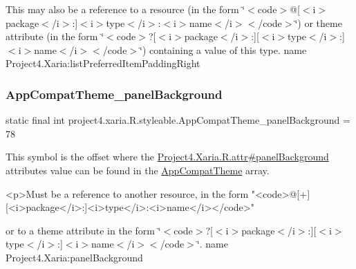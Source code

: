 This may also be a reference to a resource (in the form \char`\"{}$<$code$>$@\mbox{[}$<$i$>$package$<$/i$>$\+:\mbox{]}$<$i$>$type$<$/i$>$\+:$<$i$>$name$<$/i$>$$<$/code$>$\char`\"{}) or theme attribute (in the form \char`\"{}$<$code$>$?\mbox{[}$<$i$>$package$<$/i$>$\+:\mbox{]}\mbox{[}$<$i$>$type$<$/i$>$\+:\mbox{]}$<$i$>$name$<$/i$>$$<$/code$>$\char`\"{}) containing a value of this type.  name Project4.\+Xaria\+:list\+Preferred\+Item\+Padding\+Right \mbox{\label{classproject4_1_1xaria_1_1R_1_1styleable_ac551be8c36d995c3e33f28f517d7a324}} 
\subsubsection{\texorpdfstring{App\+Compat\+Theme\+\_\+panel\+Background}{AppCompatTheme\_panelBackground}}
{\footnotesize\ttfamily static final int project4.\+xaria.\+R.\+styleable.\+App\+Compat\+Theme\+\_\+panel\+Background = 78\hspace{0.3cm}{\ttfamily [static]}}

This symbol is the offset where the \hyperlink{}{Project4.\+Xaria.\+R.\+attr\#panel\+Background} attribute\textquotesingle{}s value can be found in the \hyperlink{classproject4_1_1xaria_1_1R_1_1styleable_aad8bec413e2350f9404e6ff0e831a85d}{App\+Compat\+Theme} array.

\begin{DoxyVerb}      <p>Must be a reference to another resource, in the form "<code>@[+][<i>package</i>:]<i>type</i>:<i>name</i></code>"
\end{DoxyVerb}
 or to a theme attribute in the form \char`\"{}$<$code$>$?\mbox{[}$<$i$>$package$<$/i$>$\+:\mbox{]}\mbox{[}$<$i$>$type$<$/i$>$\+:\mbox{]}$<$i$>$name$<$/i$>$$<$/code$>$\char`\"{}.  name Project4.\+Xaria\+:panel\+Background \mbox{\label{classproject4_1_1xaria_1_1R_1_1styleable_a1d930daeea752accaa963f15053cb96c}} 

